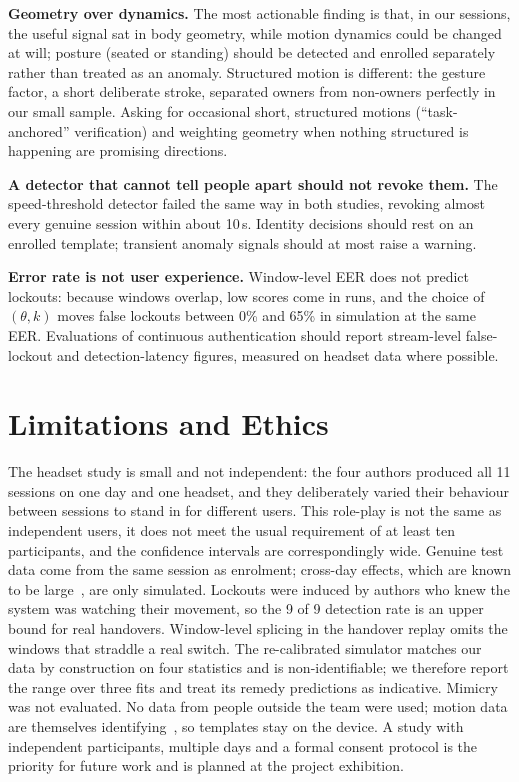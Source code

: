 \textbf{Geometry over dynamics.} The most actionable finding is that, in our sessions, the useful signal sat in body geometry, while motion dynamics could be changed at will; posture (seated or standing) should be detected and enrolled separately rather than treated as an anomaly. Structured motion is different: the gesture factor, a short deliberate stroke, separated owners from non-owners perfectly in our small sample. Asking for occasional short, structured motions (``task-anchored'' verification) and weighting geometry when nothing structured is happening are promising directions.

\textbf{A detector that cannot tell people apart should not revoke them.} The speed-threshold detector failed the same way in both studies, revoking almost every genuine session within about 10\,s. Identity decisions should rest on an enrolled template; transient anomaly signals should at most raise a warning.

\textbf{Error rate is not user experience.} Window-level EER does not predict lockouts: because windows overlap, low scores come in runs, and the choice of $(\theta, k)$ moves false lockouts between 0\% and 65\% in simulation at the same EER. Evaluations of continuous authentication should report stream-level false-lockout and detection-latency figures, measured on headset data where possible.

\section{Limitations and Ethics}
The headset study is small and not independent: the four authors produced all 11 sessions on one day and one headset, and they deliberately varied their behaviour between sessions to stand in for different users. This role-play is not the same as independent users, it does not meet the usual requirement of at least ten participants, and the confidence intervals are correspondingly wide. Genuine test data come from the same session as enrolment; cross-day effects, which are known to be large~\cite{miller2022}, are only simulated. Lockouts were induced by authors who knew the system was watching their movement, so the 9 of 9 detection rate is an upper bound for real handovers. Window-level splicing in the handover replay omits the windows that straddle a real switch. The re-calibrated simulator matches our data by construction on four statistics and is non-identifiable; we therefore report the range over three fits and treat its remedy predictions as indicative. Mimicry was not evaluated. No data from people outside the team were used; motion data are themselves identifying~\cite{miller2020,nair2023}, so templates stay on the device. A study with independent participants, multiple days and a formal consent protocol is the priority for future work and is planned at the project exhibition.

